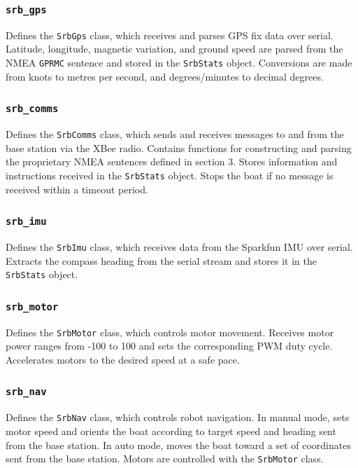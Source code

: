 \documentclass[a4paper]{IEEEtran}
\begin{document}
\subsubsection{\texttt{srb\_gps}}
Defines the \texttt{SrbGps} class, which receives and parses GPS fix data over serial. Latitude, longitude, magnetic variation, and ground speed are parsed from the NMEA \texttt{GPRMC} sentence and stored in the \texttt{SrbStats} object. Conversions are made from knots to metres per second, and degrees/minutes to decimal degrees.

\subsubsection{\texttt{srb\_comms}}
Defines the \texttt{SrbComms} class, which sends and receives messages to and from the base station via the XBee radio. Contains functions for constructing and parsing the proprietary NMEA sentences defined in section 3. Stores information and instructions received in the \texttt{SrbStats} object. Stops the boat if no message is received within a timeout period.

\subsubsection{\texttt{srb\_imu}}
Defines the \texttt{SrbImu} class, which receives data from the Sparkfun IMU over serial. Extracts the compass heading from the serial stream and stores it in the \texttt{SrbStats} object.

\subsubsection{\texttt{srb\_motor}}
Defines the \texttt{SrbMotor} class, which controls motor movement. Receives motor power ranges from -100 to 100 and sets the corresponding PWM duty cycle. Accelerates motors to the desired speed at a safe pace.

\subsubsection{\texttt{srb\_nav}}
Defines the \texttt{SrbNav} class, which controls robot navigation. In manual mode, sets motor speed and orients the boat according to target speed and heading sent from the base station. In auto mode, moves the boat toward a set of coordinates sent from the base station. Motors are controlled with the \texttt{SrbMotor} class.
\end{document}

